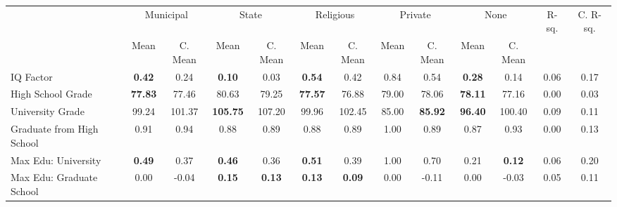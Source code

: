 \begin{tabular}{l c c c c c c c c c c c c}
\toprule
& \multicolumn{2}{c}{Municipal} & \multicolumn{2}{c}{State} & \multicolumn{2}{c}{Religious} & \multicolumn{2}{c}{Private} & \multicolumn{2}{c}{None} & R-sq. & C. R-sq. \\
& \scriptsize Mean & \scriptsize C. Mean & \scriptsize Mean & \scriptsize C. Mean & \scriptsize Mean & \scriptsize C. Mean & \scriptsize Mean & \scriptsize C. Mean & \scriptsize Mean & \scriptsize C. Mean & & \\
\midrule
IQ Factor & \textbf{     0.42} & 0.24 & \textbf{     0.10} & 0.03 & \textbf{     0.54} & 0.42 &      0.84 & 0.54 & \textbf{     0.28} & 0.14 &      0.06 &      0.17 \\
High School Grade & \textbf{    77.83} & 77.46 &     80.63 & 79.25 & \textbf{    77.57} & 76.88 &     79.00 & 78.06 & \textbf{    78.11} & 77.16 &      0.00 &      0.03 \\
University Grade &     99.24 & 101.37 & \textbf{   105.75} & 107.20 &     99.96 & 102.45 &     85.00 & \textbf{    85.92} & \textbf{    96.40} & 100.40 &      0.09 &      0.11 \\
Graduate from High School &      0.91 & 0.94 &      0.88 & 0.89 &      0.88 & 0.89 &      1.00 & 0.89 &      0.87 & 0.93 &      0.00 &      0.13 \\
Max Edu: University & \textbf{     0.49} & 0.37 & \textbf{     0.46} & 0.36 & \textbf{     0.51} & 0.39 &      1.00 & 0.70 &      0.21 & \textbf{     0.12} &      0.06 &      0.20 \\
Max Edu: Graduate School &      0.00 & -0.04 & \textbf{     0.15} & \textbf{     0.13} & \textbf{     0.13} & \textbf{     0.09} &      0.00 & -0.11 &      0.00 & -0.03 &      0.05 &      0.11 \\
\bottomrule
\end{tabular}
